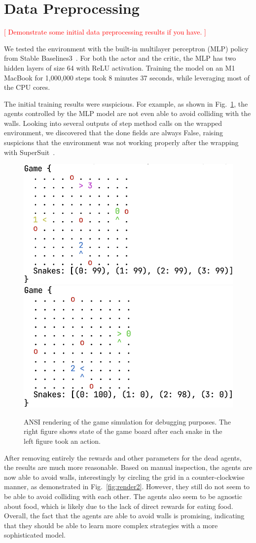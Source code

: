 \documentclass[a4paper]{article}
\newcommand{\todo}[1]{\textcolor{red}{[ #1 ]}}
\begin{document}
\section{Data Preprocessing}

\todo{Demonstrate some initial data preprocessing results if you have.}

We tested the environment with the built-in multilayer perceptron (MLP)
policy from Stable Baselines3~\cite{raffin2024stable}.
For both the actor and the critic,
the MLP has two hidden layers of size 64 with ReLU activation.
Training the model on an M1 MacBook for 1,000,000 steps took 8 minutes 37
seconds, while leveraging most of the CPU cores.

The initial training results were suspicious. For example,
as shown in Fig.~\ref{fig:render},
the agents controlled by the MLP model are not even able to avoid colliding with
the walls. Looking into several outputs of \textsf{step}
method calls on the wrapped environment, we discovered that the \textsf{done}
fields are always \textsf{False}, raising suspicions that the environment was
not working properly after the wrapping with SuperSuit~\cite{SuperSuit}.

\begin{figure}
    \centering
    \includegraphics[width=0.4\linewidth]{game_render_eg.png}\quad
    \includegraphics[width=0.4\linewidth]{game_render_eg1.png}
    \caption{ANSI rendering of the game simulation for debugging purposes.
        The right figure shows state of the game board after each snake in the
        left figure took an action.
    }
    \label{fig:render}
\end{figure}

After removing entirely the rewards and other parameters for the dead agents,
the results are much more reasonable. Based on manual inspection,
the agents are now able to avoid walls,
interestingly by circling the grid in a counter-clockwise manner, as demonstrated in Fig.~\ref{fig:render2}. However,
they still do not seem to be able to avoid colliding with each other.
The agents also seem to be agnostic about food,
which is likely due to the lack of direct rewards for eating food.
Overall, the fact that the agents are able to avoid walls is promising,
indicating that they should be able to learn more complex strategies with
a more sophisticated model.
\end{document}
